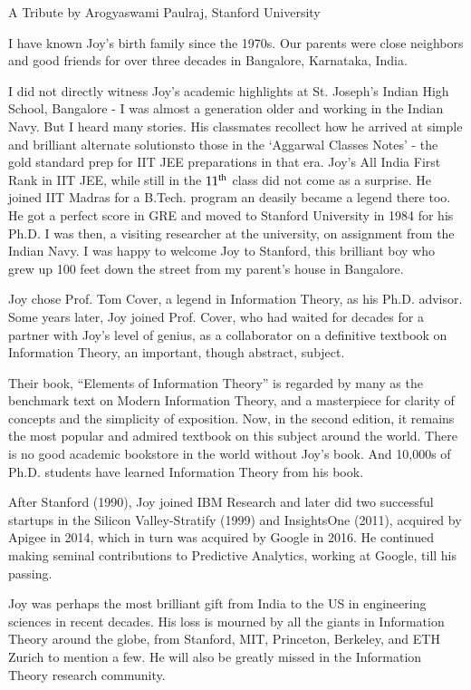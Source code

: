 \begin{multicols}{2}
A Tribute by Arogyaswami Paulraj, Stanford University

I have known Joy’s birth family since the 1970s. Our parents were close neighbors and good friends for over three decades in Bangalore, Karnataka, India.

I did not directly witness Joy’s academic highlights at St. Joseph’s Indian High School, Bangalore - I was almost a generation older and working in the Indian Navy. But I heard many stories.  His classmates recollect how he arrived at simple and brilliant alternate solutionsto those in the ‘Aggarwal Classes Notes’ - the gold standard prep for IIT JEE preparations in that era. Joy’s All India First Rank in IIT JEE, while still in the $11^{\rm th}$ class did not come as a surprise. He joined IIT Madras for a B.Tech. program an deasily became a legend there too. He got a perfect score in GRE and moved to Stanford University in 1984 for his Ph.D. I was then, a visiting researcher at the university, on assignment from the Indian Navy. I was happy to welcome Joy to Stanford, this brilliant boy who grew up 100 feet down the street from my parent’s house in Bangalore.

Joy chose Prof. Tom Cover, a legend in Information Theory, as his Ph.D. advisor. Some years later, Joy joined Prof. Cover, who had waited for decades for a partner with Joy’s level of genius, as a collaborator on a definitive textbook on Information Theory, an important, though abstract, subject.

Their book, “Elements of Information Theory” is regarded by many as the benchmark text on Modern Information Theory, and a masterpiece for clarity of concepts and the simplicity of exposition. Now, in the second edition, it remains the most popular and admired textbook on this subject around the world. There is no good academic bookstore in the world without Joy’s book. And 10,000s of Ph.D. students have learned Information Theory from his book.

After Stanford (1990), Joy joined IBM Research and later did two successful startups in the Silicon Valley-Stratify (1999) and InsightsOne (2011), acquired by Apigee in 2014, which in turn was acquired by Google in 2016. He continued making seminal contributions to Predictive Analytics, working at Google, till his passing.

Joy was perhaps the most brilliant gift from India to the US in engineering sciences in recent decades. His loss is mourned by all the giants in Information Theory around the globe, from Stanford, MIT, Princeton, Berkeley, and ETH Zurich to mention a few. He will also be greatly missed in the Information Theory research community.


\end{multicols}
